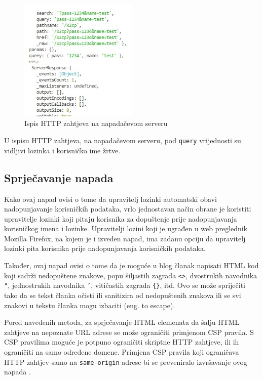 \documentclass[12pt, oneside, onecolumn]{book}
\begin{document}
{\begin{figure}[H]
	\begin{center}
		\includegraphics[width=0.5\textwidth]{xss2cp_ser.jpg}
		\caption{Ispis HTTP zahtjeva na napadačevom serveru} \label{fig:xss2cp_ser}
	\end{center}
\end{figure}

U ispisu HTTP zahtjeva, na napadačevom serveru, pod \texttt{query} vrijednosti su vidljivi lozinka i korisničko ime žrtve.

\subsection{Sprječavanje napada}
Kako ovaj napad ovisi o tome da upravitelj lozinki automatski obavi nadopunjavanje korisničkih podataka, vrlo jednostavan način obrane je koristiti upravitelje lozinki koji pitaju korisnika za dopuštenje prije nadopunjavanja korisničkog imena i lozinke. Upravitelji lozini koji je ugrađen u web preglednik Mozilla Firefox, na kojem je i izveden napad, ima zadanu opciju da upravitelj lozinki pita korisnika prije nadopunjavanja korisničkih podataka.

Također, ovaj napad ovisi o tome da je moguće u blog članak napisati HTML kod koji sadrži nedopuštene znakove, popu šiljastih zagrada \texttt{<>}, dvostrukih navodnika \texttt{"}, jednostrukih navodnika \texttt{'}, vitičastih zagrada \texttt{\{\}}, itd. Ovo se može spriječiti tako da se tekst članka očisti ili sanitizira od nedopuštenih znakova ili se svi znakovi u tekstu članka mogu izbaciti (eng. to escape).

Pored navedenih metoda, za sprječavanje HTML elemenata da šalju HTML zahtjeve na nepoznate URL adrese se može ograničiti primjenom CSP pravila. S CSP pravilima moguće je potpuno ograničiti skriptne HTTP zahtjeve, ili ih ograničiti na samo određene domene. Primjena CSP pravila koji ograničava HTTP zahtjev samo na \texttt{same-origin} adrese bi se preveniralo izvršavanje ovog napada \cite{x2cpport}.

}
\end{document}
